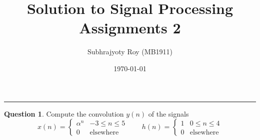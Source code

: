 \documentclass[12pt]{article}
\title{Solution to Signal Processing Assignments 2}
\author{Subhrajyoty Roy (MB1911)}
\date{\today}
\theoremstyle{definition}
\newtheorem{question}{Question}
\begin{document}
\maketitle

\begin{center}
    \rule{0.8\textwidth}{1px} 
\end{center}
\vspace*{2em}

\begin{question}
    Compute the convolution $y(n)$ of the signals
    $$
    x(n) = \begin{cases}
        \alpha^n & -3 \leq n \leq 5\\
        0 & \text{elsewhere}
    \end{cases} \qquad 
    h(n) = \begin{cases}
        1 & 0 \leq n \leq 4\\
        0 & \text{elsewhere}
    \end{cases}
    $$
\end{question}
\end{document}
